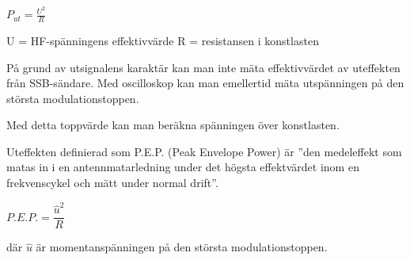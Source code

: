 \(P_{ut} = \frac{U^2}{R}\)

U = HF-spänningens effektivvärde
R = resistansen i konstlasten

På grund av utsignalens karaktär kan man inte mäta effektivvärdet av uteffekten
från SSB-sändare. Med oscilloskop kan man emellertid mäta utspänningen på den
största modulationstoppen.

Med detta toppvärde kan man beräkna spänningen över konstlasten.

Uteffekten definierad som P.E.P. (Peak Envelope Power) är ''den medeleffekt som
matas in i en antennmatarledning under det högsta effektvärdet inom en
frekvenscykel och mätt under normal drift''.

\(P.E.P. = \dfrac{\hat{u}^2}{R}\)

där \(\hat{u}\) är momentanspänningen på den största modulationstoppen.

